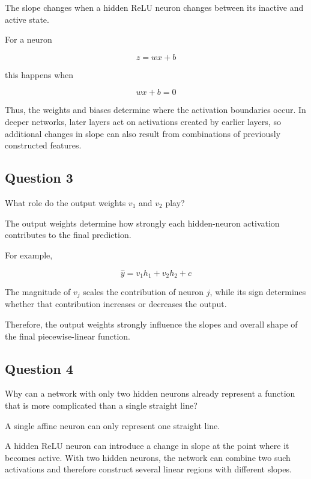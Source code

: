 \documentclass[10pt]{article}
\begin{document}
\begingroup\color{red}

The slope changes when a hidden ReLU neuron changes between its inactive and active state.

For a neuron

\[
z=wx+b
\]

this happens when

\[
wx+b=0
\]

Thus, the weights and biases determine where the activation boundaries occur. In deeper networks, later layers act on activations created by earlier layers, so additional changes in slope can also result from combinations of previously constructed features.

\par\endgroup

\subsection*{Question 3}
What role do the output weights $v_1$ and $v_2$ play?

\begingroup\color{red}

The output weights determine how strongly each hidden-neuron activation contributes to the final prediction.

For example,

\[
\hat y=v_1h_1+v_2h_2+c
\]

The magnitude of $v_j$ scales the contribution of neuron $j$, while its sign determines whether that contribution increases or decreases the output.

Therefore, the output weights strongly influence the slopes and overall shape of the final piecewise-linear function.

\par\endgroup

\subsection*{Question 4}
Why can a network with only two hidden neurons already represent a function that is more complicated than a single straight line?

\begingroup\color{red}

A single affine neuron can only represent one straight line.

A hidden ReLU neuron can introduce a change in slope at the point where it becomes active. With two hidden neurons, the network can combine two such activations and therefore construct several linear regions with different slopes.
\end{document}
